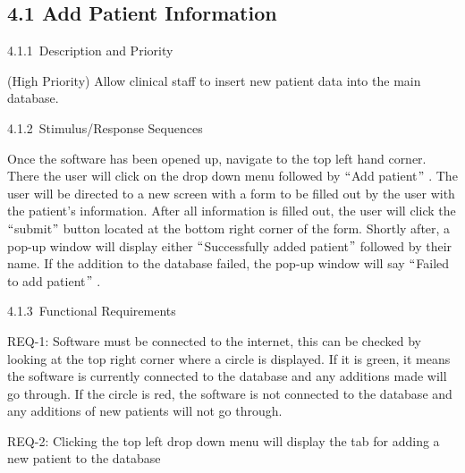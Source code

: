 \documentclass[12pt]{article}
\renewcommand{\_}{\kern-1.5pt\textunderscore\kern-1.5pt}
\begin{document}
\subsection*{4.1 \hspace*{10pt}Add Patient Information}
\setlength{\parskip}{12.0pt}
4.1.1\  \tab Description and Priority\par

(High Priority) Allow clinical staff to insert new patient data into the main database.\par

4.1.2\  \tab Stimulus/Response Sequences\par

Once the software has been opened up, navigate to the top left hand corner. There the user will click on the drop down menu followed by $``$Add patient$"$ . The user will be directed to a new screen with a form to be filled out by the user with the patient's information. After all information is filled out, the user will click the $``$submit$"$  button located at the bottom right corner of the form. Shortly after, a pop-up window will display either $``$Successfully added patient$"$  followed by their name. If the addition to the database failed, the pop-up window will say $``$Failed to add patient$"$ .\par

4.1.3\  \tab Functional Requirements\par

\begin{adjustwidth}{0.5in}{0.0in}
REQ-1: Software must be connected to the internet, this can be checked by looking at the top right corner where a circle is displayed. If it is green, it means the software is currently connected to the database and any additions made will go through. If the circle is red, the software is not connected to the database and any additions of new patients will not go through.\par

\end{adjustwidth}

\begin{adjustwidth}{0.5in}{0.0in}
REQ-2: Clicking the top left drop down menu will display the tab for adding a new patient to the database\par

\end{adjustwidth}
\end{document}
